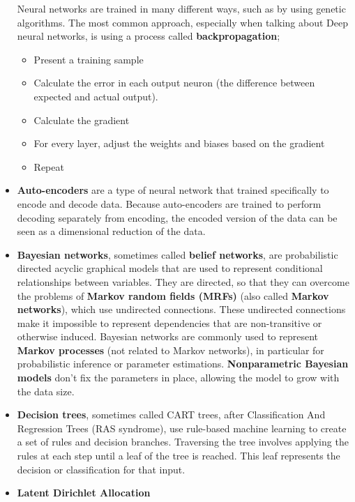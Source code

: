 \begin{itemize}
\begin{itemize}
		\end{itemize}
		Neural networks are trained in many different ways, such as by using genetic algorithms. The most common approach, especially when talking about Deep neural networks, is using a process called \textbf{backpropagation};
		\begin{itemize}
			\item Present a training sample
			\item Calculate the error in each output neuron (the difference between expected and actual output).
			\item Calculate the gradient
			\item For every layer, adjust the weights and biases based on the gradient
			\item Repeat
		\end{itemize}
	\item \textbf{Auto-encoders}
		are a type of neural network that trained specifically to encode and decode data. Because auto-encoders are trained to perform decoding separately from encoding, the encoded version of the data can be seen as a dimensional reduction of the data.
	\item \textbf{Bayesian networks}, 
		sometimes called \textbf{belief networks}, are probabilistic directed acyclic graphical models\cite{Wain08}\cite{Kol09}\cite{Xin16} that are used to represent conditional relationships between variables. They are directed, so that they can overcome the problems of \textbf{Markov random
		fields (MRFs)} (also called \textbf{Markov networks}), which use undirected connections. These undirected connections make it impossible to represent dependencies that are non-transitive or otherwise induced. Bayesian networks are commonly used to represent \textbf{Markov processes} (not related to Markov networks), in particular for probabilistic inference or parameter estimations.
		\textbf{Nonparametric Bayesian models}\cite{Grif05}\cite{Teh06} don't fix the parameters in place, allowing the model to grow with the data size.
	\item \textbf{Decision trees},
		sometimes called CART trees, after Classification And Regression Trees (RAS syndrome), use rule-based machine learning to create a set of rules and decision branches. Traversing the tree involves applying the rules at each step until a leaf of the tree is reached. This leaf represents the decision or classification for that input.
	\item \textbf{Latent Dirichlet Allocation}\cite{Blei03}

\end{itemize}
